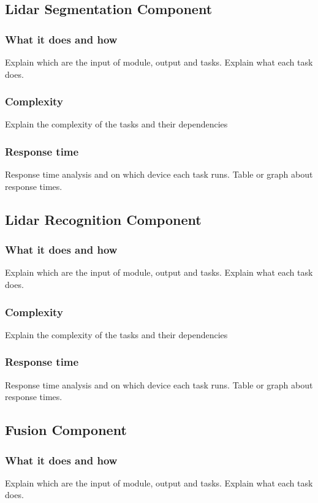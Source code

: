 \documentclass[conference]{IEEEtran}
\begin{document}
\subsection{Lidar Segmentation Component}

\subsubsection{What it does and how}
Explain which are the input of module, output and tasks.
Explain what each task does.
\subsubsection{Complexity}
Explain the complexity of the tasks and their dependencies
\subsubsection{Response time}
Response time analysis and on which device each task runs.
Table or graph about response times.

\subsection{Lidar Recognition Component}

\subsubsection{What it does and how}
Explain which are the input of module, output and tasks.
Explain what each task does.
\subsubsection{Complexity}
Explain the complexity of the tasks and their dependencies
\subsubsection{Response time}
Response time analysis and on which device each task runs.
Table or graph about response times.

\subsection{Fusion Component}

\subsubsection{What it does and how}
Explain which are the input of module, output and tasks.
Explain what each task does.
\end{document}
